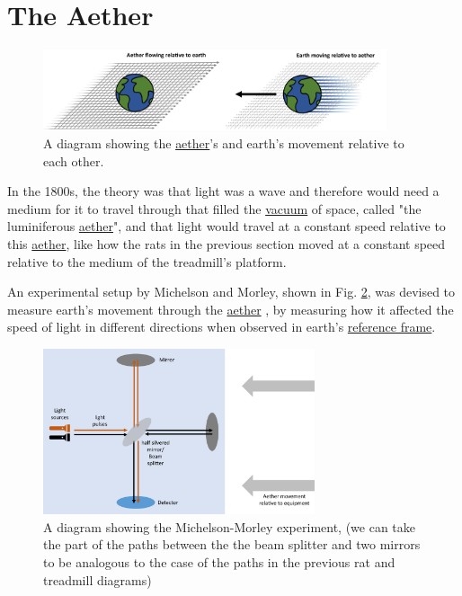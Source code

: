 \section{The Aether}%

\begin{figure}[ht]
	\centering
	\includegraphics[width=0.9\textwidth]{images/pdf/earth_and_aether.pdf}
	\caption{A diagram showing the \protect\hyperlink{def-aether}{aether}'s and earth's movement relative to each other.}
	\label{fig: Aether}
\end{figure}

In the 1800s, the theory was that light was a wave and therefore would need a medium for it to travel through that filled the \hyperlink{def-vacuum}{vacuum} of space, called "the luminiferous \hyperlink{def-aether}{aether}", and that light would travel at a constant speed relative to this \hyperlink{def-aether}{aether}, like how the rats in the previous section moved at a constant speed relative to the medium of the treadmill's platform.

An experimental setup by Michelson and Morley, shown in Fig. \ref{fig: Michelson_morley}, was devised to measure earth's movement through the \hyperlink{def-aether}{aether} \cite{EtherExperiment}, by measuring how it affected the speed of light in different directions when observed in earth's \hyperlink{def-Reference-frame}{reference frame}.

\begin{figure}[H]
	\centering
	\includegraphics[width=8cm]{images/pdf/Michelson_morley.pdf}
	\caption{A diagram showing the Michelson-Morley experiment, (we can take the part of the paths between the the beam splitter and two mirrors to be analogous to the case of the paths in the previous rat and treadmill diagrams) }
	\label{fig: Michelson_morley}
\end{figure}

